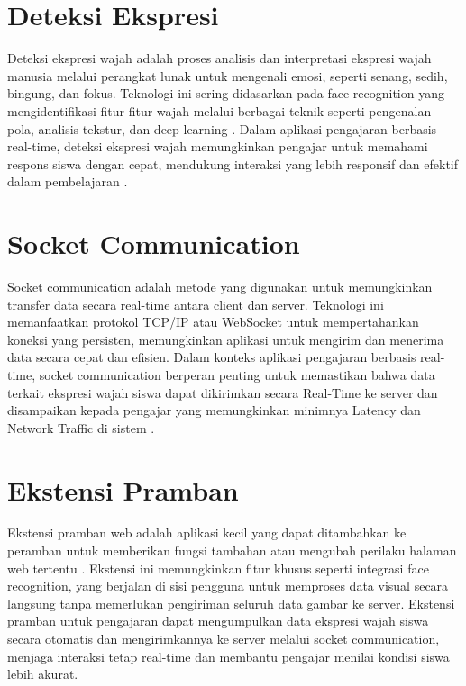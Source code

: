 \section{Deteksi Ekspresi}
Deteksi ekspresi wajah adalah proses analisis dan interpretasi ekspresi wajah manusia melalui perangkat lunak untuk mengenali emosi, seperti senang, sedih, bingung, dan fokus. Teknologi ini sering didasarkan pada face recognition yang mengidentifikasi fitur-fitur wajah melalui berbagai teknik seperti pengenalan pola, analisis tekstur, dan deep learning \parencite{archanaRealTimeFace2022}. Dalam aplikasi pengajaran berbasis real-time, deteksi ekspresi wajah memungkinkan pengajar untuk memahami respons siswa dengan cepat, mendukung interaksi yang lebih responsif dan efektif dalam pembelajaran \parencite{archanaRealTimeFace2022}.

\section{Socket Communication}
Socket communication adalah metode yang digunakan untuk memungkinkan transfer data secara real-time antara client dan server. Teknologi ini memanfaatkan protokol TCP/IP atau WebSocket untuk mempertahankan koneksi yang persisten, memungkinkan aplikasi untuk mengirim dan menerima data secara cepat dan efisien. Dalam konteks aplikasi pengajaran berbasis real-time, socket communication berperan penting untuk memastikan bahwa data terkait ekspresi wajah siswa dapat dikirimkan secara Real-Time ke server dan disampaikan kepada pengajar yang memungkinkan minimnya Latency dan Network Traffic di sistem \parencite{ogundeyiWebSocketRealTime2019}.

\section{Ekstensi Pramban}
Ekstensi pramban web adalah aplikasi kecil yang dapat ditambahkan ke peramban untuk memberikan fungsi tambahan atau mengubah perilaku halaman web tertentu \parencite{jinImpactExtensionsBrowser2024}. Ekstensi ini memungkinkan fitur khusus seperti integrasi face recognition, yang berjalan di sisi pengguna untuk memproses data visual secara langsung tanpa memerlukan pengiriman seluruh data gambar ke server. Ekstensi pramban untuk pengajaran dapat mengumpulkan data ekspresi wajah siswa secara otomatis dan mengirimkannya ke server melalui socket communication, menjaga interaksi tetap real-time dan membantu pengajar menilai kondisi siswa lebih akurat.

